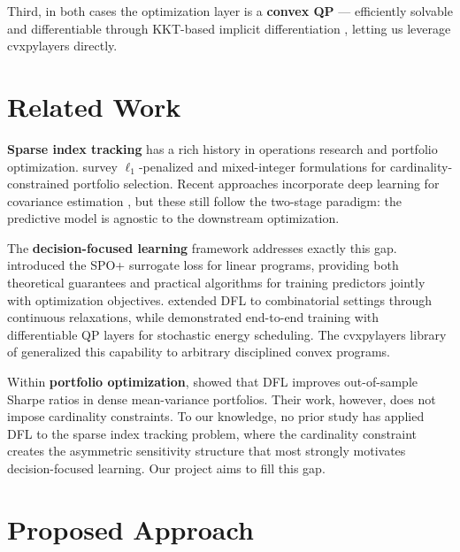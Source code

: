 \documentclass[11pt]{article}
\begin{document}
Third, in both cases the optimization layer is a \textbf{convex QP} --- efficiently solvable and differentiable through KKT-based implicit differentiation \citep{agrawal2019differentiable}, letting us leverage cvxpylayers directly.

\section{Related Work}

\textbf{Sparse index tracking} has a rich history in operations research and portfolio optimization. \citet{benidis2018sparse} survey $\ell_1$-penalized and mixed-integer formulations for cardinality-constrained portfolio selection. Recent approaches incorporate deep learning for covariance estimation \citep{xu2024deep}, but these still follow the two-stage paradigm: the predictive model is agnostic to the downstream optimization.

The \textbf{decision-focused learning} framework addresses exactly this gap. \citet{elmachtoub2022smart} introduced the SPO+ surrogate loss for linear programs, providing both theoretical guarantees and practical algorithms for training predictors jointly with optimization objectives. \citet{wilder2019melding} extended DFL to combinatorial settings through continuous relaxations, while \citet{donti2017task} demonstrated end-to-end training with differentiable QP layers for stochastic energy scheduling. The cvxpylayers library of \citet{agrawal2019differentiable} generalized this capability to arbitrary disciplined convex programs.

Within \textbf{portfolio optimization}, \citet{butler2023integrating} showed that DFL improves out-of-sample Sharpe ratios in dense mean-variance portfolios. Their work, however, does not impose cardinality constraints. To our knowledge, no prior study has applied DFL to the sparse index tracking problem, where the cardinality constraint creates the asymmetric sensitivity structure that most strongly motivates decision-focused learning. Our project aims to fill this gap.

\section{Proposed Approach}
\end{document}
